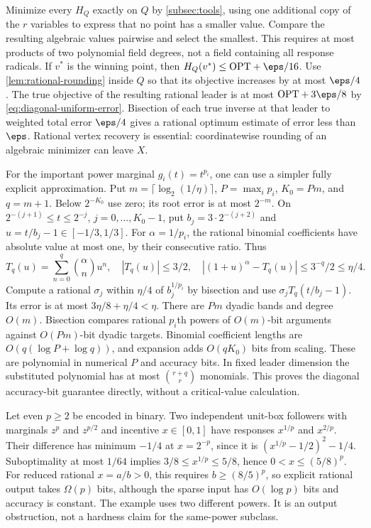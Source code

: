 Minimize every $H_Q$ exactly on $Q$ by \cref{subsec:tools}, using
one additional copy of the $r$ variables to express that no point has a
smaller value. Compare the resulting algebraic values pairwise and
select the smallest. This requires at most products of two polynomial
field degrees, not a field containing all response radicals. If $v^*$
is the winning point, then $H_Q(v^*)\le\mathrm{OPT}+\eps/16$.
Use \cref{lem:rational-rounding} inside $Q$ so that its objective
increases by at most $\eps/4$. The true objective of the resulting
rational leader is at most $\mathrm{OPT}+3\eps/8$ by
\eqref{eq:diagonal-uniform-error}. Bisection of each true inverse at
that leader to weighted total error $\eps/4$ gives a rational optimum
estimate of error less than $\eps$. Rational vertex recovery is essential:
coordinatewise rounding of an algebraic minimizer can leave $X$.

For the important power marginal $g_i(t)=t^{p_i}$, one can use a simpler
fully explicit approximation. Put $m=\lceil\log_2(1/\eta)\rceil$,
$P=\max_i p_i$, $K_0=Pm$, and $q=m+1$. Below $2^{-K_0}$ use zero;
its root error is at most $2^{-m}$. On
$2^{-(j+1)}\le t\le2^{-j}$, $j=0,\ldots,K_0-1$, put
$b_j=3\cdot2^{-(j+2)}$ and $u=t/b_j-1\in[-1/3,1/3]$.
For $\alpha=1/p_i$, the rational binomial coefficients have absolute
value at most one, by their consecutive ratio. Thus
\[
 T_q(u)=\sum_{n=0}^q\binom\alpha n u^n,\quad
 |T_q(u)|\le3/2,\quad
 |(1+u)^\alpha-T_q(u)|\le3^{-q}/2\le\eta/4.
\]
Compute a rational $\sigma_j$ within $\eta/4$ of $b_j^{1/p_i}$ by
bisection and use $\sigma_jT_q(t/b_j-1)$. Its error is at most
$3\eta/8+\eta/4<\eta$. There are $Pm$ dyadic bands and degree
$O(m)$. Bisection compares rational $p_i$th powers of
$O(m)$-bit arguments against $O(Pm)$-bit dyadic targets. Binomial
coefficient lengths are $O(q(\log P+\log q))$, and expansion adds
$O(qK_0)$ bits from scaling. These are polynomial in numerical $P$
and accuracy bits. In fixed leader dimension the substituted polynomial
has at most $\binom{r+q}{r}$ monomials. This proves the diagonal
accuracy-bit guarantee directly, without a critical-value calculation.

\begin{example}
\label{ex:sparse-power-output}
Let even $p\ge2$ be encoded in binary. Two independent unit-box
followers with marginals $z^{p}$ and $z^{p/2}$ and incentive $x\in[0,1]$
have responses $x^{1/p}$ and $x^{2/p}$. Their difference has minimum
$-1/4$ at $x=2^{-p}$, since it is $(x^{1/p}-1/2)^2-1/4$.
Suboptimality at most $1/64$ implies
$3/8\le x^{1/p}\le5/8$, hence $0<x\le(5/8)^p$.
For reduced rational $x=a/b>0$, this requires $b\ge(8/5)^p$,
so explicit rational output takes $\Omega(p)$ bits, although the
sparse input has $O(\log p)$ bits and accuracy is constant. The
example uses two different powers. It is an output obstruction, not a
hardness claim for the same-power subclass.
\end{example}


